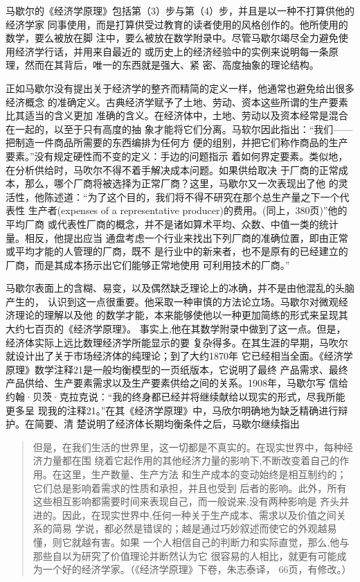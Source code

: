 马歇尔的《经济学原理》包括第（3）步与第（4）步，并且是以一种不打算供他的经济学家
同事使用，而是打算供受过教育的读者使用的风格创作的。他所使用的数学，要么被放在脚
注中，要么被放在数学附录中。尽管马歇尔竭尽全力避免使用经济学行话，并用来自最近的
或历史上的经济经验中的实例来说明每一条原理，然而在其背后，唯一的东西就是强大、紧
密、高度抽象的理论结构。

正如马歇尔没有提出关于经济学的整齐而精简的定义一样，他通常也避免给出很多经济概念
的准确定义。古典经济学赋予了土地、劳动、资本这些所谓的生产要素比其适当的含义更加
准确的含义。在经济体中，土地、劳动以及资本经常是混合在一起的，以至于只有高度的抽
象才能将它们分离。马软尔因此指出：“我们——把制造一件商品所需要的东西编排为任何方
便的组别，并把它们称作商品的生产要素。”没有规定硬性而不变的定义：手边的问题指示
着如何界定要素。类似地，在分析供给时，马吹尔不得不着手解决成本问题。如果供给取决
于厂商的正常成本，那么，哪个厂商将被选择为正常厂商？这里，马歇尔又一次表现出了他
的灵活性，他陈述道：“为了这个目的，我们将不得不研究在那个总生产量之下一个代表性
生产者(expenses of a representative producer)的费用。(同上，380页)”他的平均厂商
或代表性厂商的概念，并不是诸如算术平均、众数、中值一类的统计量。相反，他提出应当
通盘考虑一个行业来找出下列厂商的准确位置，即由正常或平均才能的人管理的厂商，既不
是行业中的新来者，也不是原有的已经建立的厂商，而是其成本扬示出它们能够正常地使用
可利用技术的厂商。”

马歇尔表面上的含糊、易变，以及偶然缺乏理论上的冰确，并不是由他混乱的头脑产生的，
认识到这一点很重要。他采取一种审慎的方法论立场。马歇尔对微观经济理论的理解以及他
的数学才能，本来能够使他以一种更加简练的形式来呈现其大约七百页的《经济学原理》。
事实上,他在其数学附录中做到了这一点。但是，经济体实际上远比数理经济学所能显示的要
复杂得多。在其生涯的早期，马吹尔就设计出了关于市场经济体的纯理论；到了大约1870年
它已经相当全面。《经济学原理》数学注释21是一般均衡模型的一页纸版本，它说明了最终
产品需求、最终产品供给、生产要素需求以及生产要素供给之间的关系。1908年，马歇尔写
信给约翰·贝茨·克拉克说：“我的终身都已经并将继续献给以现实的形式，尽我所能更多呈
现我的注释21。”在其《经济学原理》中，马欣尔明确地为缺乏精确进行辩护。在简要、清
楚说明了经济体长期均衡条件之后，马歇尔继续指出

\begin{quotation}
  但是，在我们生活的世界里，这一切都是不真实的。在现实世界中，每种经济力量都在围
  绕着它起作用的其他经济力量的影响下,不断改变着自己的作用。在这里，生产数量、生产方法
  和生产成本的变动始终是相互制约的；它们总是影响着需求的性质和承担，并且也受到
  后者的影响。此外，所有这些相互影响都需要时间来表现自己，而一般说来,没有两种影响是
  齐头并进的。因此，在现实世界中,任何一种关于生产成本、需求以及价值之间关系的简易
  学说，都必然是错误的；越是通过巧妙叙述而使它的外观越易懂，则它就越有害。如果
  一个人相信自己的判断力和实际直觉，那么,他与那些自以为研究了价值理论并断然认为它
  很容易的人相比，就更有可能成为一个好的经济学家。（《经济学原理》下卷，朱志泰译，
  66页，有修改。）
\end{quotation}

